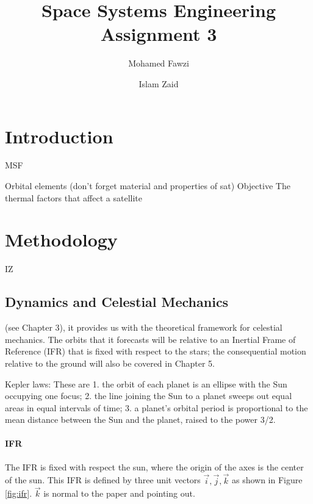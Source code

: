 \documentclass[11pt]{article}
\title{Space Systems Engineering Assignment 3}
\author[1]{Mohamed Fawzi}
\author[2]{Islam Zaid}
\affil[1]{Aerospace Department, Khalifa University\\100064444@ku.ac.ae}
\affil[2]{Aerospace Department, Khalifa University\\islam.zaid@ku.ac.ae}
\date{}
\begin{document}
\maketitle


\section{Introduction} MSF
\indent

Orbital elements (don't forget material and properties of sat)
Objective
The thermal factors that affect a satellite

\newpage



\section{Methodology} IZ  %
\indent
\subsection{Dynamics and Celestial Mechanics}

(see Chapter 3), it provides us with the theoretical framework for celestial
mechanics. The orbits that it forecasts will be relative to an Inertial Frame of Reference
(IFR) that is fixed with respect to the stars; the consequential motion relative to the ground
will also be covered in Chapter 5.

Kepler laws:
These are
1. the orbit of each planet is an ellipse with the Sun occupying one focus;
2. the line joining the Sun to a planet sweeps out equal areas in equal intervals of time;
3. a planet’s orbital period is proportional to the mean distance between the Sun and the
planet, raised to the power 3/2.\\

\paragraph{\ac{IFR}} 
The \ac{IFR} is fixed with respect the sun, where the origin of the axes is the center of the sun. This \ac{IFR} is defined by three unit vectors $\vec{i}, \vec{j}, \vec{k}$ as shown in Figure \ref{fig:ifr}. $\vec{k}$ is normal to the paper and pointing out.
\end{document}

